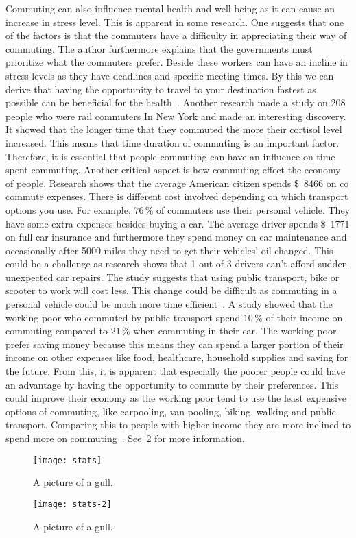 Commuting can also influence mental health and well-being as it can cause an increase in stress level.
This is apparent in some research.
One suggests that one of the factors is that the commuters have a difficulty in appreciating their way of commuting.
The author furthermore explains that the governments must prioritize what the commuters prefer.
Beside these workers can have an incline in stress levels as they have deadlines and specific meeting times.
By this we can derive that having the opportunity to travel to your destination fastest as possible can be beneficial
for the health~\cite{koslowsky2013}.
Another research made a study on 208 people who were rail commuters In New York and made an interesting discovery.
It showed that the longer time that they commuted the more their cortisol level increased.
This means that time duration of commuting is an important factor.
Therefore, it is essential that people commuting can have an influence on time spent commuting.
Another critical aspect is how commuting effect the economy of people.
Research shows that the average American citizen spends \SI{8466}[\$]{} on co commute expenses.
There is different cost involved depending on which transport options you use.
For example, \(76\,\%\) of commuters use their personal vehicle.
They have some extra expenses besides buying a car.
The average driver spends \SI{1771}[\$]{} on full car insurance and furthermore they spend money on car maintenance
and occasionally after 5000 miles they need to get their vehicles' oil changed.
This could be a challenge as research shows that 1 out of 3 drivers can't afford sudden unexpected car repairs.
The study suggests that using public transport, bike or scooter to work will cost less.
This change could be difficult as commuting in a personal vehicle could be much more time efficient~\cite{bankrate2023}.
A study showed that the working poor who commuted by public transport spend \(10\,\%\) of their income on commuting
compared to \(21\,\%\) when commuting in their car.
The working poor prefer saving money because this means they can spend a larger portion of their income on other
expenses like food, healthcare, household supplies and saving for the future.
From this, it is apparent that especially the poorer people could have an advantage by having the opportunity to
commute by their preferences.
This could improve their economy as the working poor tend to use the least expensive options of commuting, like
carpooling, van pooling, biking, walking and public transport.
Comparing this to people with higher income they are more inclined to spend more on commuting~\cite{bankrate2023}.
See~\ref{fig:figure2} for more information.

\begin{figure}
    \centering
    \texttt{[image: stats]}
    \caption{A picture of a gull.}
    \label{fig:figure}
\end{figure}

\begin{figure}
    \texttt{[image: stats-2]}
    \caption{A picture of a gull.}
    \label{fig:figure2}
\end{figure}
